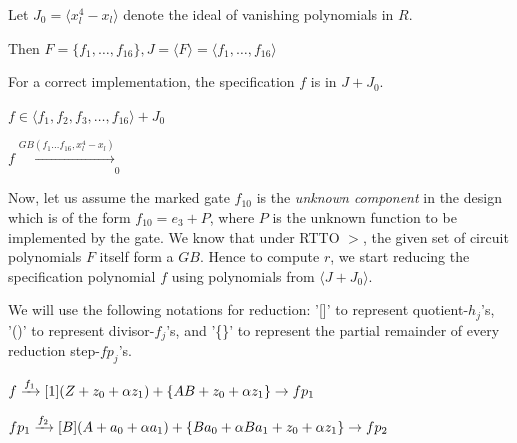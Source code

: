 \begin{Example}
Let $J_0 = \langle x_l^4 - x_l\rangle$ denote the ideal of vanishing
polynomials in $R$. 
\begin{small}
Then $F = \{f_1,\dots,f_{16}\}, J = \langle F\rangle = \langle
f_1,\dots,f_{16}\rangle$
\end{small}

For a correct implementation, the specification $f$ is in $J + J_0$.

$f \in \langle f_1,f_2,f_3,\dots,f_{16}\rangle+J_0$

$f \xrightarrow[]{GB(f_1\dots f_{16}, x_l^4-x_l)}_0$

Now, let us assume the marked gate $f_{10}$ is the \textit{unknown
  component} in the design which is of the form $f_{10} = e_3 + P$,
where $P$ is the unknown function to be implemented by the gate. We
know that under RTTO $>$, the given set of circuit polynomials $F$
itself form a $GB$. Hence to compute $r$, we start reducing the 
specification polynomial $f$ using polynomials from $\langle J + J_0\rangle$.  

We will use the following notations for reduction: '[]' to represent quotient-$h_j$'s, '()' to represent divisor-$f_j$'s, and '\{\}' to represent the partial remainder of every reduction step-$fp_j$'s.

\begin{small}
$f\xrightarrow[]{f_{1}}[1](Z + z_0 +\alpha z_1)+\{ AB+z_0+\alpha z_1\}\rightarrow fp_1$

$fp_1\xrightarrow[]{f_2}[B](A+a_0+\alpha a_1)+\{Ba_0+\alpha Ba_1+z_0+\alpha z_1\}\rightarrow fp_2$


\end{small}
\end{Example}
